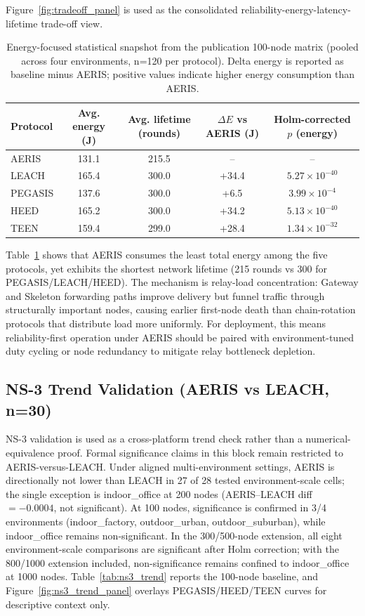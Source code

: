 ﻿\documentclass[sensors,article,submit,moreauthors,pdftex]{Definitions/mdpi}
\begin{document}
Figure~\ref{fig:tradeoff_panel} is used as the consolidated reliability-energy-latency-lifetime trade-off view.
\begin{table}[H]
\caption{Energy-focused statistical snapshot from the publication 100-node matrix (pooled across four environments, n=120 per protocol). Delta energy is reported as baseline minus AERIS; positive values indicate higher energy consumption than AERIS.}
\label{tab:energy_snapshot}
\centering
\begin{tabular}{lcccc}
\toprule
Protocol & Avg. energy (J) & Avg. lifetime (rounds) & $\Delta E$ vs AERIS (J) & Holm-corrected $p$ (energy) \\
\midrule
AERIS   & 131.1 & 215.5 & --    & -- \\
LEACH   & 165.4 & 300.0 & +34.4 & $5.27\times10^{-40}$ \\
PEGASIS & 137.6 & 300.0 & +6.5  & $3.99\times10^{-4}$ \\
HEED    & 165.2 & 300.0 & +34.2 & $5.13\times10^{-40}$ \\
TEEN    & 159.4 & 299.0 & +28.4 & $1.34\times10^{-32}$ \\
\bottomrule
\end{tabular}
\end{table}
Table~\ref{tab:energy_snapshot} shows that AERIS consumes the least total energy among the five protocols, yet exhibits the shortest network lifetime (215 rounds vs 300 for PEGASIS/LEACH/HEED). The mechanism is relay-load concentration: Gateway and Skeleton forwarding paths improve delivery but funnel traffic through structurally important nodes, causing earlier first-node death than chain-rotation protocols that distribute load more uniformly. For deployment, this means reliability-first operation under AERIS should be paired with environment-tuned duty cycling or node redundancy to mitigate relay bottleneck depletion.

\subsection{NS-3 Trend Validation (AERIS vs LEACH, n=30)}
NS-3 validation is used as a cross-platform trend check rather than a numerical-equivalence proof. Formal significance claims in this block remain restricted to AERIS-versus-LEACH. Under aligned multi-environment settings, AERIS is directionally not lower than LEACH in 27 of 28 tested environment-scale cells; the single exception is indoor\_office at 200 nodes (AERIS--LEACH diff $=-0.0004$, not significant). At 100 nodes, significance is confirmed in 3/4 environments (indoor\_factory, outdoor\_urban, outdoor\_suburban), while indoor\_office remains non-significant. In the 300/500-node extension, all eight environment-scale comparisons are significant after Holm correction; with the 800/1000 extension included, non-significance remains confined to indoor\_office at 1000 nodes. Table~\ref{tab:ns3_trend} reports the 100-node baseline, and Figure~\ref{fig:ns3_trend_panel} overlays PEGASIS/HEED/TEEN curves for descriptive context only.
\end{document}
